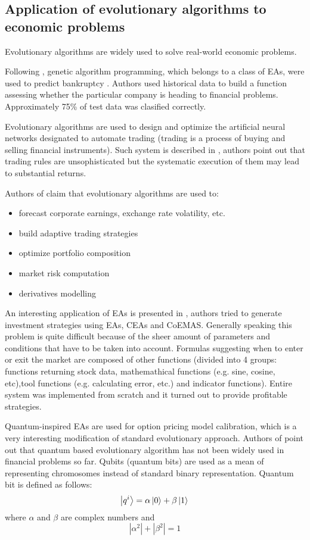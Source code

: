 \subsection{Application of evolutionary algorithms to economic problems}

Evolutionary algorithms are widely used to solve real-world economic problems.

Following \cite{EA-bankruptcy}, genetic algorithm programming, which belongs to a class of EAs, were used to predict bankruptcy .
Authors used historical data to build a function assessing whether the particular company is heading to financial problems.
Approximately 75\% of test data was clasified correctly.

Evolutionary algorithms are used to design and optimize the artificial neural networks designated to automate trading (trading is a process of buying and
 selling financial instruments).
Such system is described in \cite{trading}, authors point out that trading rules are unsophisticated but the systematic execution of them may lead to substantial 
returns.

Authors of \cite{intro_to_finance} claim that evolutionary algorithms are used to: 

\begin{itemize}
  \item forecast corporate earnings, exchange rate volatility, etc.
  \item build adaptive trading strategies
  \item optimize portfolio composition
  \item market risk computation
  \item derivatives modelling
\end{itemize}

An interesting application of EAs is presented in \cite{Dre_Sep}, authors tried to generate investment strategies using EAs, CEAs and CoEMAS.
Generally speaking this problem is quite difficult because of the sheer amount of parameters and conditions that have to be taken into account.
Formulas suggesting when to enter or exit the market are composed of other functions (divided into 4 groups: functions returning stock data, mathemathical functions
(e.g. sine, cosine, etc),tool functions (e.g. calculating error, etc.) and indicator functions).  
Entire system was implemented from scratch and it turned out to provide profitable strategies. 

Quantum-inspired EAs are used for option pricing model calibration, which is a very interesting modification of standard evolutionary approach.
Authors of \cite{quantum} point out that quantum based evolutionary algorithm has not been widely used in financial problems so far.
Qubits (quantum bits) are used as a mean of representing chromosomes instead of standard binary representation.
Quantum bit is defined as follows:
$$
  \Ket{q^{i}} = \alpha \Ket{0} + \beta \Ket{1} \\
$$
where $\alpha$ and $\beta$ are complex numbers and
$$
  |\alpha^2| + |\beta^2| = 1 
$$

